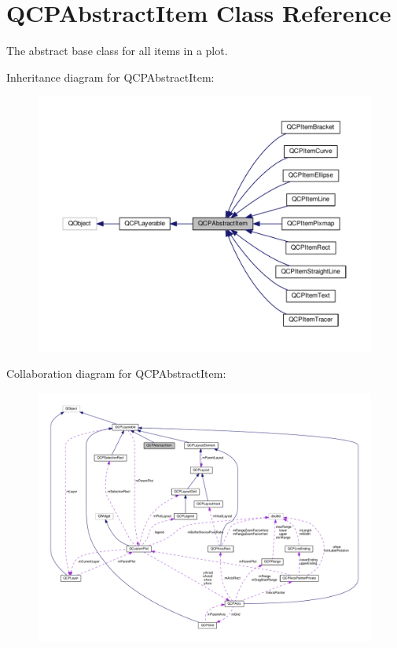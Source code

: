 \hypertarget{classQCPAbstractItem}{}\section{Q\+C\+P\+Abstract\+Item Class Reference}
\label{classQCPAbstractItem}


The abstract base class for all items in a plot.  




Inheritance diagram for Q\+C\+P\+Abstract\+Item\+:
\nopagebreak
\begin{figure}[H]
\begin{center}
\leavevmode
\includegraphics[width=350pt]{classQCPAbstractItem__inherit__graph}
\end{center}
\end{figure}


Collaboration diagram for Q\+C\+P\+Abstract\+Item\+:
\nopagebreak
\begin{figure}[H]
\begin{center}
\leavevmode
\includegraphics[width=350pt]{classQCPAbstractItem__coll__graph}
\end{center}
\end{figure}
